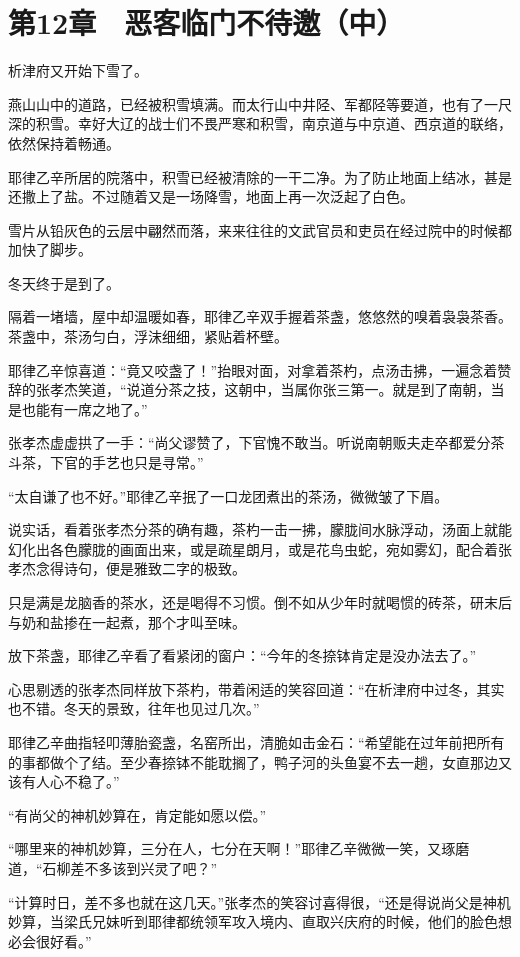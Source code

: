 \section{第12章　恶客临门不待邀（中）}

析津府又开始下雪了。

燕山山中的道路，已经被积雪填满。而太行山中井陉、军都陉等要道，也有了一尺深的积雪。幸好大辽的战士们不畏严寒和积雪，南京道与中京道、西京道的联络，依然保持着畅通。

耶律乙辛所居的院落中，积雪已经被清除的一干二净。为了防止地面上结冰，甚是还撒上了盐。不过随着又是一场降雪，地面上再一次泛起了白色。

雪片从铅灰色的云层中翩然而落，来来往往的文武官员和吏员在经过院中的时候都加快了脚步。

冬天终于是到了。

隔着一堵墙，屋中却温暖如春，耶律乙辛双手握着茶盏，悠悠然的嗅着袅袅茶香。茶盏中，茶汤匀白，浮沫细细，紧贴着杯壁。

耶律乙辛惊喜道：“竟又咬盏了！”抬眼对面，对拿着茶杓，点汤击拂，一遍念着赞辞的张孝杰笑道，“说道分茶之技，这朝中，当属你张三第一。就是到了南朝，当是也能有一席之地了。”

张孝杰虚虚拱了一手：“尚父谬赞了，下官愧不敢当。听说南朝贩夫走卒都爱分茶斗茶，下官的手艺也只是寻常。”

“太自谦了也不好。”耶律乙辛抿了一口龙团煮出的茶汤，微微皱了下眉。

说实话，看着张孝杰分茶的确有趣，茶杓一击一拂，朦胧间水脉浮动，汤面上就能幻化出各色朦胧的画面出来，或是疏星朗月，或是花鸟虫蛇，宛如雾幻，配合着张孝杰念得诗句，便是雅致二字的极致。

只是满是龙脑香的茶水，还是喝得不习惯。倒不如从少年时就喝惯的砖茶，研末后与奶和盐掺在一起煮，那个才叫至味。

放下茶盏，耶律乙辛看了看紧闭的窗户：“今年的冬捺钵肯定是没办法去了。”

心思剔透的张孝杰同样放下茶杓，带着闲适的笑容回道：“在析津府中过冬，其实也不错。冬天的景致，往年也见过几次。”

耶律乙辛曲指轻叩薄胎瓷盏，名窑所出，清脆如击金石：“希望能在过年前把所有的事都做个了结。至少春捺钵不能耽搁了，鸭子河的头鱼宴不去一趟，女直那边又该有人心不稳了。”

“有尚父的神机妙算在，肯定能如愿以偿。”

“哪里来的神机妙算，三分在人，七分在天啊！”耶律乙辛微微一笑，又琢磨道，“石柳差不多该到兴灵了吧？”

“计算时日，差不多也就在这几天。”张孝杰的笑容讨喜得很，“还是得说尚父是神机妙算，当梁氏兄妹听到耶律都统领军攻入境内、直取兴庆府的时候，他们的脸色想必会很好看。”

